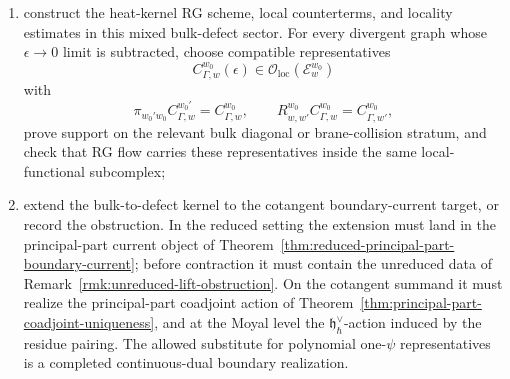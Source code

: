 \documentclass[11pt]{memoir}
\begin{document}
\begin{prob}
\begin{enumerate}
	      prove that this extraction cancels, renormalizes, or otherwise accounts
	      for the normal-ordering shift of
	      Remark~\ref{rmk:normal-ordering-obstruction};
	    \item construct the heat-kernel RG scheme, local counterterms, and
	      locality estimates in this mixed bulk-defect sector. For every
	      divergent graph
	      whose \(\epsilon\to0\) limit is subtracted, choose compatible
	      representatives
	      \[
	        C_{\Gamma,w}^{w_0}(\epsilon)\in
	          \mathcal O_{\mathrm{loc}}(\mathcal E_w^{w_0})
	      \]
	      with
	      \[
	        \pi_{w_0'w_0}C_{\Gamma,w}^{w_0'}=C_{\Gamma,w}^{w_0},
	        \qquad
	        R^{w_0}_{w,w'}C_{\Gamma,w}^{w_0}=C_{\Gamma,w'}^{w_0},
	      \]
	      prove support on the relevant bulk diagonal or brane-collision
	      stratum, and check that RG flow carries these representatives inside
	      the same local-functional subcomplex;
	    \item extend the bulk-to-defect kernel to the cotangent boundary-current
	      target, or record the obstruction. In the reduced setting the
	      extension must land in the principal-part current object of
	      Theorem~\ref{thm:reduced-principal-part-boundary-current}; before
	      contraction it must contain the unreduced data of
	      Remark~\ref{rmk:unreduced-lift-obstruction}. On the cotangent summand it
	      must realize the principal-part coadjoint action of
	      Theorem~\ref{thm:principal-part-coadjoint-uniqueness}, and at the
	      Moyal level the \(\mathfrak h_\hbar^\vee\)-action induced by the
	      residue pairing. The allowed substitute for polynomial one-\(\psi\)
	      representatives is a completed continuous-dual boundary realization.
	  \end{enumerate}
\end{prob}
\end{document}
